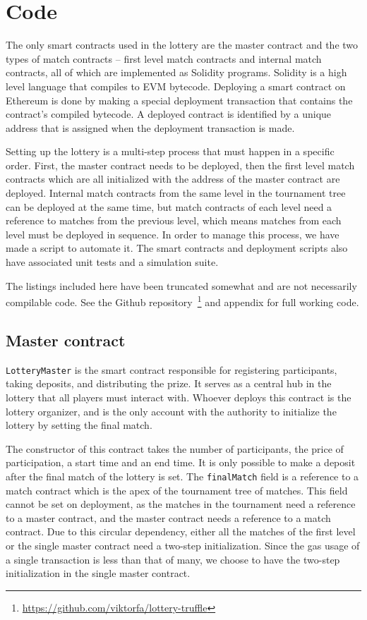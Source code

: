 \section{Code}
\label{sec:code}

The only smart contracts used in the lottery are the master contract and the two types of match contracts – first level match contracts and internal match contracts, all of which are implemented as Solidity programs. Solidity is a high level language that compiles to EVM bytecode. Deploying a smart contract on Ethereum is done by making a special deployment transaction that contains the contract's compiled bytecode. A deployed contract is identified by a unique address that is assigned when the deployment transaction is made.

Setting up the lottery is a multi-step process that must happen in a specific order. First, the master contract needs to be deployed, then the first level match contracts which are all initialized with the address of the master contract are deployed. Internal match contracts from the same level in the tournament tree can be deployed at the same time, but match contracts of each level need a reference to matches from the previous level, which means matches from each level must be deployed in sequence. In order to manage this process, we have made a script to automate it. The smart contracts and deployment scripts also have associated unit tests and a simulation suite.

The listings included here have been truncated somewhat and are not necessarily compilable code. See the Github repository~\footnote{\url{https://github.com/viktorfa/lottery-truffle}} and appendix for full working code.

\subsection{Master contract}
\texttt{LotteryMaster} is the smart contract responsible for registering participants, taking deposits, and distributing the prize. It serves as a central hub in the lottery that all players must interact with. Whoever deploys this contract is the lottery organizer, and is the only account with the authority to initialize the lottery by setting the final match. 

The constructor of this contract takes the number of participants, the price of participation, a start time and an end time. It is only possible to make a deposit after the final match of the lottery is set. The \texttt{finalMatch} field is a reference to a match contract which is the apex of the tournament tree of matches. This field cannot be set on deployment, as the matches in the tournament need a reference to a master contract, and the master contract needs a reference to a match contract. Due to this circular dependency, either all the matches of the first level or the single master contract need a two-step initialization. Since the gas usage of a single transaction is less than that of many, we choose to have the two-step initialization in the single master contract.


